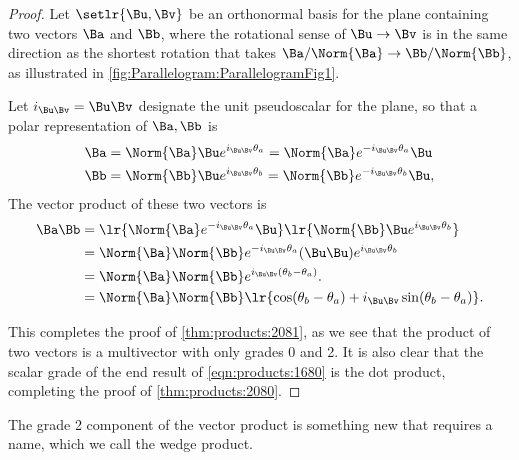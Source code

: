 \begin{proof}
Let \( \setlr{\Bu, \Bv} \) be an orthonormal basis for the plane containing
two vectors \( \Ba \) and \( \Bb \), where the rotational sense of \( \Bu \rightarrow \Bv \) is in the same direction as the shortest rotation that takes \( \Ba/\Norm{\Ba} \rightarrow \Bb/\Norm{\Bb} \), as illustrated in \cref{fig:Parallelogram:ParallelogramFig1}.

Let \( i_{\Bu \Bv} = \Bu \Bv \) designate the unit pseudoscalar for the plane, so that
a polar representation of \( \Ba, \Bb \) is
\begin{equation}\label{eqn:products:1660}
\begin{aligned}
\Ba &= \Norm{\Ba} \Bu e^{ i_{\Bu \Bv} \theta_a } = \Norm{\Ba} e^{ -i_{\Bu \Bv} \theta_a } \Bu \\
\Bb &= \Norm{\Bb} \Bu e^{ i_{\Bu \Bv} \theta_b } = \Norm{\Bb} e^{ -i_{\Bu \Bv} \theta_b } \Bu,
\end{aligned}
\end{equation}
The vector product of these two vectors is
\begin{equation}\label{eqn:products:1680}
\begin{aligned}
\Ba \Bb
&= \lr{ \Norm{\Ba} e^{ -i_{\Bu \Bv} \theta_a } \Bu } \lr{ \Norm{\Bb} \Bu e^{ i_{\Bu \Bv} \theta_b } } \\
&= \Norm{\Ba} \Norm{\Bb} e^{ -i_{\Bu \Bv} \theta_a } ( \Bu \Bu ) e^{ i_{\Bu \Bv} \theta_b } \\
&= \Norm{\Ba} \Norm{\Bb} e^{ i_{\Bu \Bv} (\theta_b - \theta_a)}. \\
&= \Norm{\Ba} \Norm{\Bb} \lr{ \cos (\theta_b - \theta_a) + i_{\Bu \Bv} \sin (\theta_b - \theta_a) }.
\end{aligned}
\end{equation}

This completes the proof of \cref{thm:products:2081}, as we see that the
product of two vectors is a multivector with only grades 0 and 2.
It is also clear that
the scalar grade of the end result of \cref{eqn:products:1680} is the 
dot product, completing the proof of \cref{thm:products:2080}.
\end{proof}

The grade 2 component of the vector product is something new that requires a name, which we call the wedge product.
\index{\(\Ba \wedge \Bb\)}

